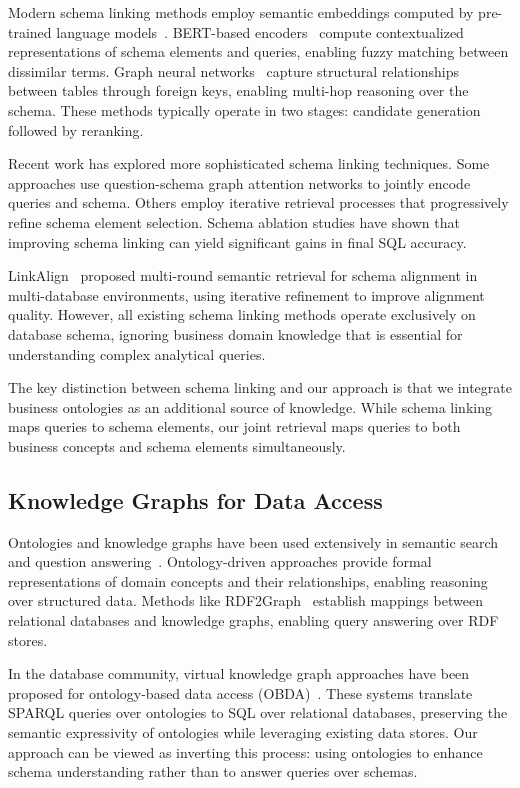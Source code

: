 \documentclass[sigconf, nonatbib]{acmart}
\begin{document}
Modern schema linking methods employ semantic embeddings computed by pre-trained language models~\cite{devlin2019bert}. BERT-based encoders~\cite{shi2020encoding} compute contextualized representations of schema elements and queries, enabling fuzzy matching between dissimilar terms. Graph neural networks~\cite{kipf2017semi,velivckovic2018graph} capture structural relationships between tables through foreign keys, enabling multi-hop reasoning over the schema. These methods typically operate in two stages: candidate generation followed by reranking.

Recent work has explored more sophisticated schema linking techniques. Some approaches use question-schema graph attention networks to jointly encode queries and schema. Others employ iterative retrieval processes that progressively refine schema element selection. Schema ablation studies have shown that improving schema linking can yield significant gains in final SQL accuracy.

LinkAlign~\cite{wang2025linkalign} proposed multi-round semantic retrieval for schema alignment in multi-database environments, using iterative refinement to improve alignment quality. However, all existing schema linking methods operate exclusively on database schema, ignoring business domain knowledge that is essential for understanding complex analytical queries.

The key distinction between schema linking and our approach is that we integrate business ontologies as an additional source of knowledge. While schema linking maps queries to schema elements, our joint retrieval maps queries to both business concepts and schema elements simultaneously.

\subsection{Knowledge Graphs for Data Access}

Ontologies and knowledge graphs have been used extensively in semantic search and question answering~\cite{ji2021survey}. Ontology-driven approaches provide formal representations of domain concepts and their relationships, enabling reasoning over structured data. Methods like RDF2Graph~\cite{petful2010rdf2graph} establish mappings between relational databases and knowledge graphs, enabling query answering over RDF stores.

In the database community, virtual knowledge graph approaches have been proposed for ontology-based data access (OBDA)~\cite{poggi2008linking}. These systems translate SPARQL queries over ontologies to SQL over relational databases, preserving the semantic expressivity of ontologies while leveraging existing data stores. Our approach can be viewed as inverting this process: using ontologies to enhance schema understanding rather than to answer queries over schemas.
\end{document}

